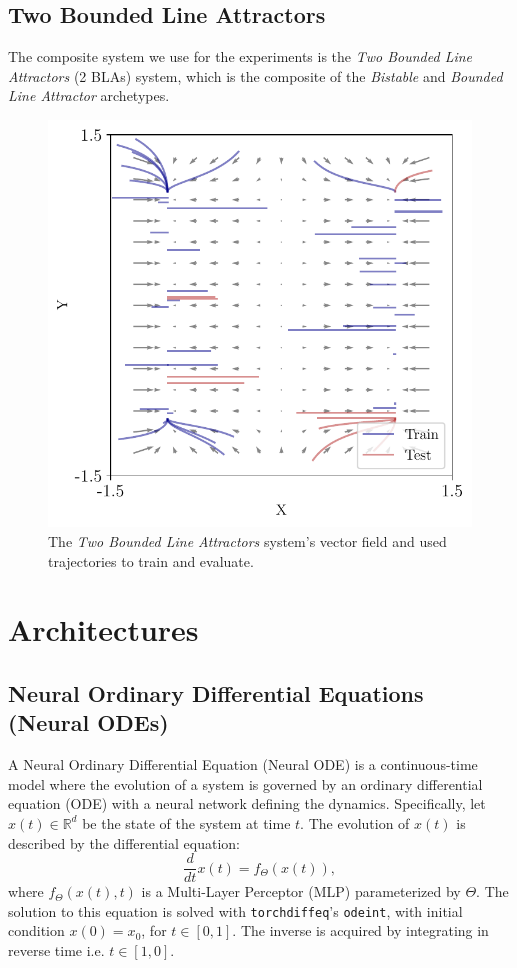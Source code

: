 \documentclass{article}
\theoremstyle{definition} \newtheorem{definition}{Definition}  \newtheorem{example}{Example}
\theoremstyle{remark} \newtheorem{remark}{Remark}
\newcounter{ct}
\begin{document}
\subsection{Two Bounded Line Attractors}
The composite system we use for the experiments is the \emph{Two Bounded Line Attractors} (2 BLAs) system, which is the composite of the \emph{Bistable} and \emph{Bounded Line Attractor} archetypes.
\begin{figure}[htbp]
    \centering
    \includegraphics[width=.5\linewidth]{twoblas_vf_trajs}
    \caption{The \emph{Two Bounded Line Attractors} system's vector field and used trajectories to train and evaluate.
     }
    \label{fig:twoblas_vf_trajs}
\end{figure}



\newpage
\section{Architectures}\label{sec:architectures}
\subsection{Neural Ordinary Differential Equations (Neural ODEs)}\label{sec:node}
\citep{chen2018neural,massaroli2020dissecting}
A Neural Ordinary Differential Equation (Neural ODE) is a continuous-time model where the evolution of a system is governed by an ordinary differential equation (ODE) with a neural network defining the dynamics.
Specifically, let \( x(t) \in \mathbb{R}^d \) be the state of the system at time \( t \). 
The evolution of \( x(t) \) is described by the differential equation:
\begin{equation}
    \frac{d}{dt} x(t) = f_\Theta(x(t)),
\end{equation}
where \( f_\Theta(x(t), t) \) is a Multi-Layer Perceptor (MLP) parameterized by \( \Theta \).
The solution to this equation is solved with \texttt{torchdiffeq}'s \texttt{odeint}, with initial condition \( x(0) = x_0 \), for $t\in[0,1]$\citep{torchdiffeq}.
The inverse is acquired by integrating in reverse time i.e. $t\in[1,0]$.
\end{document}
